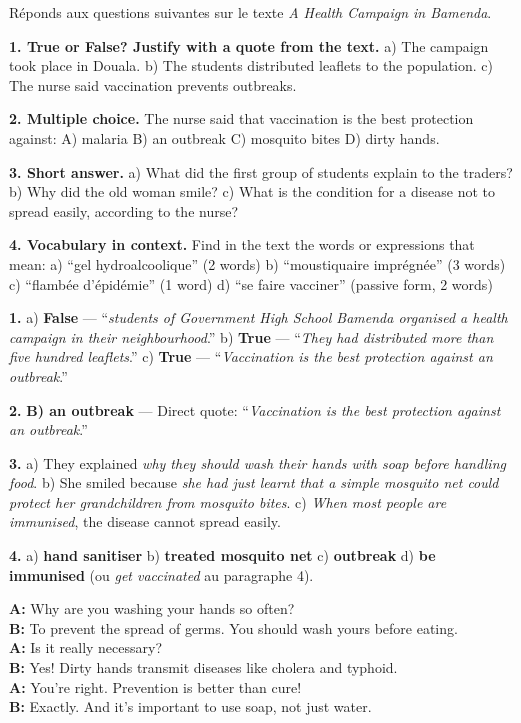 \documentclass[11pt]{article}
\newcounter{popsec}
\newcounter{popsub}
\newcommand{\courssub}[1]{%
  \stepcounter{popsub}%
  \par\vspace{9pt}\noindent{\popxbold\fontsize{11.5}{13}\selectfont\color{popink}{\color{poporange}\thepopsec.\thepopsub}\hspace{6pt}#1}\par\nopagebreak\vspace{4pt}
}
\begin{document}
\begin{exoresolu}
Réponds aux questions suivantes sur le texte \emph{A Health Campaign in Bamenda}.

\textbf{1. True or False? Justify with a quote from the text.}
a) The campaign took place in Douala.
b) The students distributed leaflets to the population.
c) The nurse said vaccination prevents outbreaks.

\textbf{2. Multiple choice.}
The nurse said that vaccination is the best protection against:
A) malaria \quad B) an outbreak \quad C) mosquito bites \quad D) dirty hands.

\textbf{3. Short answer.}
a) What did the first group of students explain to the traders?
b) Why did the old woman smile?
c) What is the condition for a disease not to spread easily, according to the nurse?

\textbf{4. Vocabulary in context.}
Find in the text the words or expressions that mean:
a) “gel hydroalcoolique” (2 words)
b) “moustiquaire imprégnée” (3 words)
c) “flambée d'épidémie” (1 word)
d) “se faire vacciner” (passive form, 2 words)

\tcblower
\textbf{1.} a) \textbf{False} — “\emph{students of Government High School Bamenda organised a health campaign in their neighbourhood}.” b) \textbf{True} — “\emph{They had distributed more than five hundred leaflets}.” c) \textbf{True} — “\emph{Vaccination is the best protection against an outbreak}.”

\textbf{2.} \textbf{B) an outbreak} — Direct quote: “\emph{Vaccination is the best protection against an outbreak}.”

\textbf{3.} a) They explained \emph{why they should wash their hands with soap before handling food}. b) She smiled because \emph{she had just learnt that a simple mosquito net could protect her grandchildren from mosquito bites}. c) \emph{When most people are immunised}, the disease cannot spread easily.

\textbf{4.} a) \textbf{hand sanitiser} \quad b) \textbf{treated mosquito net} \quad c) \textbf{outbreak} \quad d) \textbf{be immunised} (ou \emph{get vaccinated} au paragraphe 4).
\end{exoresolu}

\courssub{Step 2 — Speaking: model dialogues}

\begin{textebox}
\textbf{A:} Why are you washing your hands so often?\\
\textbf{B:} To prevent the spread of germs. You should wash yours before eating.\\
\textbf{A:} Is it really necessary?\\
\textbf{B:} Yes! Dirty hands transmit diseases like cholera and typhoid.\\
\textbf{A:} You're right. Prevention is better than cure!\\
\textbf{B:} Exactly. And it's important to use soap, not just water.
\end{textebox}
\end{document}
